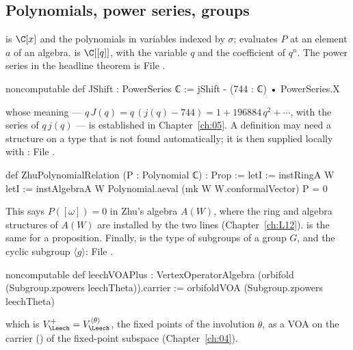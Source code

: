 \subsection{Polynomials, power series, groups}\label{ch01:sec:algebra}

 is $\C[x]$ and  the polynomials in variables indexed by
$\sigma$;  evaluates $P$ at an element $a$ of an algebra.
 is $\C[[q]]$, with  the variable $q$ and
 the coefficient of $q^n$. The power series in the headline theorem is
\noindent File .
\begin{leancode}
noncomputable def JShift : PowerSeries ℂ := jShift - (744 : ℂ) • PowerSeries.X
\end{leancode}
whose meaning --- $q\,J(q) = q\,(j(q)-744) = 1 + 196884\,q^2+\cdots$, with  the series of
$q\,j(q)$ ---
is established in Chapter~\ref{ch:05}. A definition may need a structure on a type that is not
found automatically; it is then supplied locally with :
\noindent File .
\begin{leancode}
def ZhuPolynomialRelation (P : Polynomial ℂ) : Prop :=
  letI := instRingA W
  letI := instAlgebraA W
  Polynomial.aeval (mk W W.conformalVector) P = 0
\end{leancode}
This says $P([\omega]) = 0$ in Zhu's algebra $A(W)$, where the ring and algebra structures of $A(W)$
are installed by the two  lines (Chapter~\ref{ch:L12}).  is the same for a
proposition. Finally,  is the type of subgroups of a group $G$, and
 the cyclic subgroup $\langle g\rangle$:
\noindent File .
\begin{leancode}
noncomputable def leechVOAPlus :
    VertexOperatorAlgebra (orbifold (Subgroup.zpowers leechTheta)).carrier :=
  orbifoldVOA (Subgroup.zpowers leechTheta)
\end{leancode}
which is $V_\Leech^+ = V_\Leech^{\langle\theta\rangle}$, the fixed points of the involution $\theta$,
as a VOA on the carrier () of the fixed-point subspace (Chapter~\ref{ch:04}).

